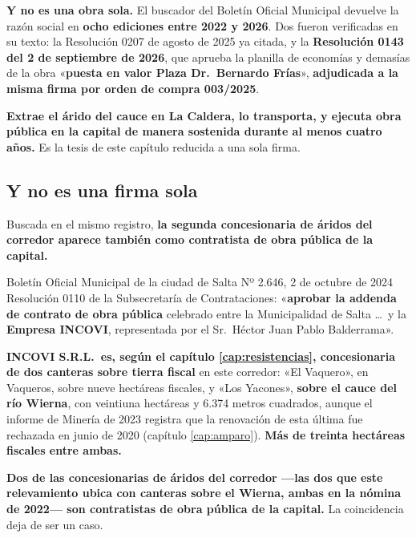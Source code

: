 \textbf{Y no es una obra sola.} El buscador del Boletín Oficial Municipal devuelve la razón
social en \textbf{ocho ediciones entre 2022 y 2026}. Dos fueron verificadas en su texto: la
Resolución 0207 de agosto de 2025 ya citada, y la \textbf{Resolución 0143 del 2 de septiembre de
2026}, que aprueba la planilla de economías y demasías de la obra «\textbf{puesta en valor
Plaza Dr.\ Bernardo Frías}», \textbf{adjudicada a la misma firma por orden de compra 003/2025}.

\textbf{Extrae el árido del cauce en La Caldera, lo transporta, y ejecuta obra pública en la
capital de manera sostenida durante al menos cuatro años.} Es la tesis de este capítulo reducida
a una sola firma.

\subsection*{Y no es una firma sola}

Buscada en el mismo registro, \textbf{la segunda concesionaria de áridos del corredor aparece
también como contratista de obra pública de la capital.}

\begin{ficha}{Boletín Oficial Municipal de la ciudad de Salta Nº 2.646, 2 de octubre de 2024}
Resolución 0110 de la Subsecretaría de Contrataciones: «\textbf{aprobar la addenda de contrato
de obra pública} celebrado entre la Municipalidad de Salta \ldots\ y la \textbf{Empresa INCOVI},
representada por el Sr.\ Héctor Juan Pablo Balderrama».
\end{ficha}

\textbf{INCOVI S.R.L.\ es, según el capítulo \ref{cap:resistencias}, concesionaria de dos
canteras sobre tierra fiscal} en este corredor: «El Vaquero», en Vaqueros, sobre nueve
hectáreas fiscales, y «Los Yacones», \textbf{sobre el cauce del río Wierna}, con veintiuna hectáreas y 6.374 metros cuadrados, aunque el informe de Minería de 2023 registra que la renovación de esta última fue rechazada en junio de 2020 (capítulo \ref{cap:amparo}). \textbf{Más de treinta hectáreas fiscales entre ambas.}

\textbf{Dos de las concesionarias de áridos del corredor ---las dos que este relevamiento ubica con canteras sobre el Wierna, ambas en la nómina de 2022---
son contratistas de obra pública de la capital.} La coincidencia deja de ser un caso.

